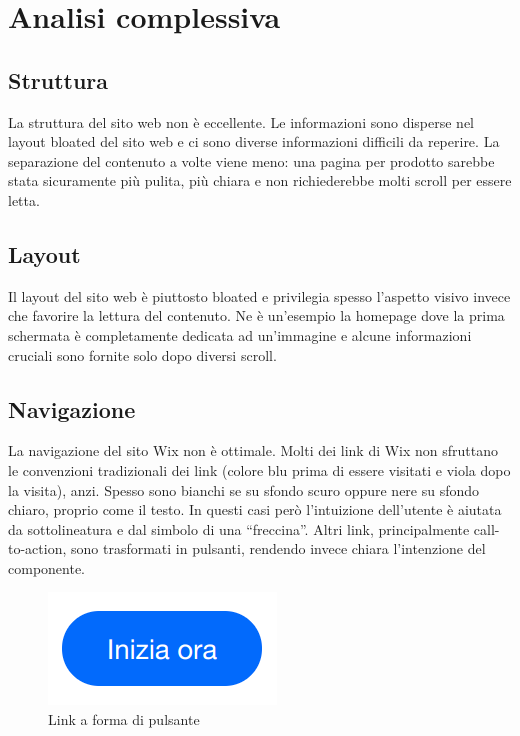\documentclass[11pt,a4paper]{article}
\newcommand*{\wix}{Wix}
\begin{document}
\section{Analisi complessiva}
\label{sec:full-analysis}

\subsection{Struttura}
\label{subsec:structure}

La struttura del sito web non è eccellente. Le informazioni sono
disperse nel layout bloated del sito web e ci sono diverse
informazioni difficili da reperire. La separazione del contenuto a
volte viene meno: una pagina per prodotto sarebbe stata sicuramente
più pulita, più chiara e non richiederebbe molti scroll per essere
letta.

\subsection{Layout}

Il layout del sito web è piuttosto bloated e privilegia spesso
l'aspetto visivo invece che favorire la lettura del contenuto. Ne è
un'esempio la homepage dove la prima schermata è completamente
dedicata ad un'immagine e alcune informazioni cruciali sono fornite
solo dopo diversi scroll.

\subsection{Navigazione}
\label{subsec:navigation}

La navigazione del sito \wix{} non è ottimale. Molti dei link di
\wix{} non sfruttano le convenzioni tradizionali dei link (colore blu
prima di essere visitati e viola dopo la visita), anzi. Spesso sono
bianchi se su sfondo scuro oppure nere su sfondo chiaro, proprio come
il testo. In questi casi però l'intuizione dell'utente è aiutata da
sottolineatura e dal simbolo di una ``freccina''. Altri link,
principalmente call-to-action, sono trasformati in pulsanti, rendendo
invece chiara l'intenzione del componente.

\begin{figure}[H]
  \centering
  \includegraphics[]{img/link-btn.png}
  \caption{Link a forma di pulsante}
  \label{fig:link-btn}
\end{figure}
\end{document}
